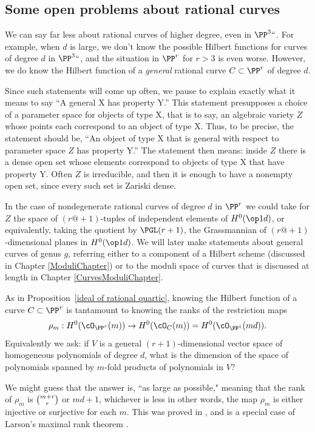 \subsection*{Some open problems about rational curves}

We can say far less about rational curves of higher degree, even in $\PP^3` `$. For example, when $d$ is large, we
don't know the possible Hilbert functions for curves of degree $d$ in $\PP^3` `$, and the situation in $\PP^r$ for
$r>3$ is even worse. However, we do know the Hilbert function of a \emph{general} rational curve $C \subset \PP^r$ of degree $d$. 

Since such statements will come up often, we pause to explain 
exactly what it means to say
%
``A general X has property Y.'' This
statement presupposes a choice of a parameter space for objects of
type X, 
that is to say, an algebraic variety $Z$ whose points each correspond to an object of type X. Thus, to be precise, the statement should be,
``An  object of type X that is general with respect to parameter space $Z$ has property Y.'' The statement then means: inside $Z$ there is
a dense open set whose elements correspond to objects of type X that have property Y. Often $Z$ is irreducible, and
then it is enough to have a nonempty open set, since every such set is Zariski dense.

In the case of nondegenerate rational curves
of degree $d$ in $\PP^{r}$ 
we could take for $Z$ the space of
$(r@{+}1)$-tuples of independent elements of $H^{0}(\op1d)$, or
equivalently, taking the quotient by $\PGL(r+1)$,
the 
Grassmannian
%
 of $(r@{+}1)$-dimensional planes in $H^{0}(\op1d)$.
We will later make statements about general curves of genus $g$, referring either to 
a component of a Hilbert scheme 
(discussed in Chapter \ref{ModuliChapter}) or to the
moduli space of curves that is discussed at length in Chapter 
\ref{CurvesModuliChapter}.

As in Proposition~\ref{ideal of rational quartic}, knowing the Hilbert function of a curve $C\subset \PP^{r}$ is tantamount to knowing the ranks of the restriction maps
$$
\rho_m : H^0(\cO_{\PP^r}(m)) \to H^0(\cO_C(m)) = H^0(\cO_{\PP^1}(md)).
$$
Equivalently we ask: if $V$ is a general  $(r+1)$-dimensional vector space of homogeneous polynomials of degree $d$, what is the dimension of the space of polynomials spanned by $m$-fold products of polynomials in $V$? 

We might guess that the answer is, ``as large as possible," meaning
that the rank of $\rho_m$ is $\tbinom{m+r}{r}$ or $md+1$, 
whichever is less
\emdash in
other words, the map $\rho_m$ is either injective or surjective for
each $m$. This was proved in \cite{Ballico-Ellia83}, and is a special
case of Larson's maximal rank theorem \cite{Larson}.

